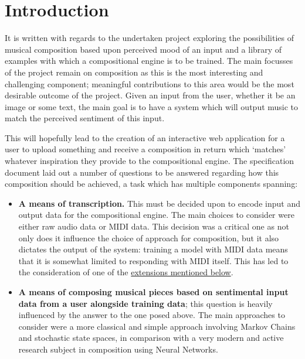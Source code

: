 \documentclass[12pt,]{article}
\providecommand{\tightlist}{%
  \setlength{\itemsep}{0pt}\setlength{\parskip}{0pt}}
\begin{document}

\hypertarget{introduction}{%
\section{Introduction}\label{introduction}}

It is written with regards to the undertaken project exploring the
possibilities of musical composition based upon perceived mood of an
input and a library of examples with which a compositional engine is to
be trained. The main focusses of the project remain on composition as
this is the most interesting and challenging component; meaningful
contributions to this area would be the most desirable outcome of the
project. Given an input from the user, whether it be an image or some
text, the main goal is to have a system which will output music to match
the perceived sentiment of this input.

This will hopefully lead to the creation of an interactive web
application for a user to upload something and receive a composition in
return which `matches' whatever inspiration they provide to the
compositional engine. The specification document laid out a number of
questions to be answered regarding how this composition should be
achieved, a task which has multiple components spanning:

\begin{itemize}
\tightlist
\item
  \textbf{A means of transcription.} This must be decided upon to encode
  input and output data for the compositional engine. The main choices
  to consider were either raw audio data or MIDI data. This decision was
  a critical one as not only does it influence the choice of approach
  for composition, but it also dictates the output of the system:
  training a model with MIDI data means that it is somewhat limited to
  responding with MIDI itself. This has led to the consideration of one
  of the \protect\hyperlink{synthesiserparameters}{extensions mentioned
  below}.
\item
  \textbf{A means of composing musical pieces based on sentimental input
  data from a user alongside training data}; this question is heavily
  influenced by the answer to the one posed above. The main approaches
  to consider were a more classical and simple approach involving Markov
  Chains and stochastic state spaces, in comparison with a very modern
  and active research subject in composition using Neural Networks.
\end{itemize}
\end{document}
